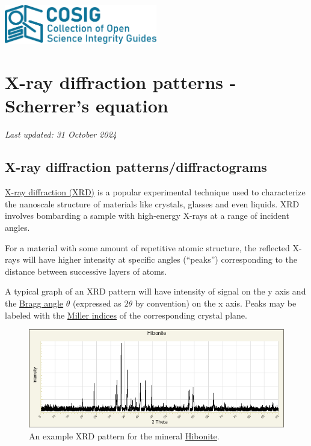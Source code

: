 \documentclass[letterpaper, 12pt]{article}
\begin{document}
\flushleft
\includegraphics[width=0.5\textwidth]{img/home/241017_final_logo_mockup.png}

\section*{X-ray diffraction patterns - Scherrer's equation}
\textit{Last updated: 31 October 2024}

\subsection*{X-ray diffraction patterns/diffractograms}

\href{https://web.pdx.edu/~pmoeck/phy381/Topic5a-XRD.pdf}{X-ray diffraction (XRD)} is a popular experimental technique used to characterize the nanoscale structure of materials like crystals, glasses and even liquids. XRD involves bombarding a sample with high-energy X-rays at a range of incident angles.

For a material with some amount of repetitive atomic structure, the reflected X-rays will have higher intensity at specific angles (``peaks'') corresponding to the distance between successive layers of atoms.

A typical graph of an XRD pattern will have intensity of signal on the y axis and the \href{https://en.wikipedia.org/wiki/Bragg%27s_law}{Bragg angle} $\theta$
(expressed as $2\theta$ by convention) on the x axis. Peaks may be labeled with the \href{https://chem.libretexts.org/Courses/Lafayette_College/CHEM_212_213%3A_Inorganic_Chemistry_(Nataro)/03%3A_Solid_state/3.10%3A_Miller_Indices_(hkl)}{Miller indices} of the corresponding crystal plane.

\begin{figure}[h!tbp]
    \includegraphics[width=\textwidth]{img/xrd/powder__2857__1486.png}
    \caption*{An example XRD pattern for the mineral \href{https://rruff.info/R061069}{Hibonite}.}
\end{figure}
\end{document}
